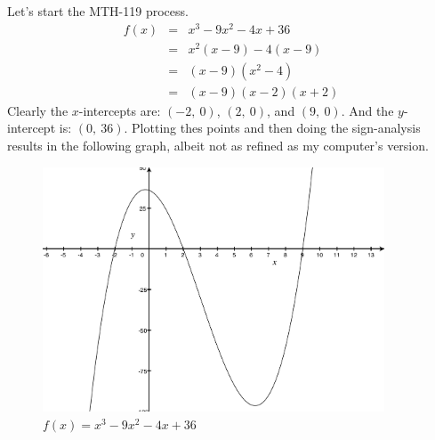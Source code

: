 \documentclass[12pt,addpoints, answers, fleqn]{exam}
\begin{document}
Let's start the MTH-119 process.
\begin{eqnarray*}
f \left( x \right) &=& x^3 - 9 x^2 - 4x +36\\
                   &=& x^2\left(x - 9\right) - 4\left(x - 9\right)\\
                   &=& \left(x - 9\right)\left(x^2 - 4\right)\\
                   &=& \left(x - 9\right)\left(x - 2\right)\left(x + 2\right)
\end{eqnarray*}
Clearly the $x$-intercepts are: $\left( -2, \ 0 \right)$, $\left( 2, \ 0 \right)$, and $\left( 9, \ 0 \right)$. And the $y$-intercept is: $\left( 0, \ 36 \right)$. Plotting thes points and then doing the sign-analysis results in the following graph, albeit not as refined as my computer's version.
\begin{figure}[htbp] %
   \centering
   \includegraphics[width=4in]{./graphics/graph2101.pdf} 
   \caption{$f \left( x \right) = x^3 - 9 x^2 - 4x +36$}
\end{figure}
\end{document}

